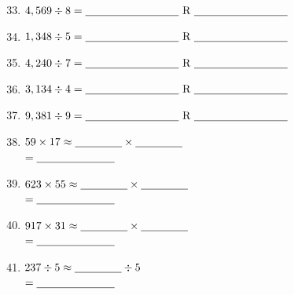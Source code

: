 \documentclass[11pt, a4paper]{article}
\begin{document}
\begin{enumerate}[label=\arabic*.]
    \setcounter{enumi}{32}
    \item $4,569 \div 8 = \text{\underline{\hspace{3cm}}} \text{ R } \text{\underline{\hspace{3cm}}}$
    \item $1,348 \div 5 = \text{\underline{\hspace{3cm}}} \text{ R } \text{\underline{\hspace{3cm}}}$
    \item $4,240 \div 7 = \text{\underline{\hspace{3cm}}} \text{ R } \text{\underline{\hspace{3cm}}}$
    \item $3,134 \div 4 = \text{\underline{\hspace{3cm}}} \text{ R } \text{\underline{\hspace{3cm}}}$
    \item $9,381 \div 9 = \text{\underline{\hspace{3cm}}} \text{ R } \text{\underline{\hspace{3cm}}}$

    \vspace{1cm}
    \item $59 \times 17 \approx \text{\underline{\hspace{1.5cm}}} \times \text{\underline{\hspace{1.5cm}}}$ \\
    \phantom{$59 \times 17$} $= \text{\underline{\hspace{2.5cm}}}$

    \item $623 \times 55 \approx \text{\underline{\hspace{1.5cm}}} \times \text{\underline{\hspace{1.5cm}}}$ \\
    \phantom{$623 \times 55$} $= \text{\underline{\hspace{2.5cm}}}$

    \item $917 \times 31 \approx \text{\underline{\hspace{1.5cm}}} \times \text{\underline{\hspace{1.5cm}}}$ \\
    \phantom{$917 \times 31$} $= \text{\underline{\hspace{2.5cm}}}$

    \item $237 \div 5 \approx \text{\underline{\hspace{1.5cm}}} \div 5$ \\
    \phantom{$237 \div 5$} $= \text{\underline{\hspace{2.5cm}}}$


\end{enumerate}
\end{document}
